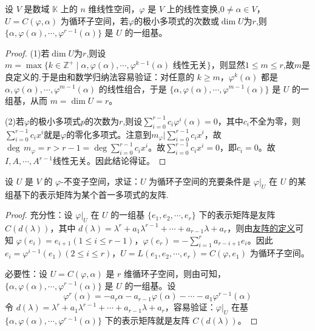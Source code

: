 \documentclass[../../main.tex]{subfiles}%
\begin{document}
\begin{theorem}\label{theorem:循环子空间的基}
设 \(V\) 是数域 \(\mathbb{K}\) 上的 \(n\) 维线性空间，\(\varphi\) 是 \(V\) 上的线性变换,\(0\neq\alpha\in V\)， \(U = C(\varphi,\alpha)\) 为循环子空间，若$\varphi$的极小多项式的次数或$\dim U$为$r$,则\(\{\alpha,\varphi(\alpha),\cdots,\varphi^{r - 1}(\alpha)\}\) 是 \(U\) 的一组基。
\end{theorem}
\begin{proof}
(1)若$\dim U$为$r$,则设 \(m = \max\{k\in\mathbb{Z}^+\mid\alpha,\varphi(\alpha),\cdots,\varphi^{k - 1}(\alpha)\text{ 线性无关}\}\)，则显然$1\leqslant  m\leqslant  r$,故$m$是良定义的.于是由和数学归纳法容易验证：对任意的 \(k\geqslant  m\)，\(\varphi^k(\alpha)\) 都是 \(\alpha,\varphi(\alpha),\cdots,\varphi^{m - 1}(\alpha)\) 的线性组合，于是 \(\{\alpha,\varphi(\alpha),\cdots,\varphi^{m - 1}(\alpha)\}\) 是 \(U\) 的一组基，从而 \(m = \dim U = r\)。 

(2)若$\varphi$的极小多项式$p$的次数为$r$,则设$\sum_{i=0}^{r-1}c_i\varphi^i(\alpha)=0$，其中$c_i$不全为零，则$\sum_{i=0}^{r-1}c_ix^i$就是$\varphi$的零化多项式。注意到$m_{\varphi}|\sum_{i=0}^{r-1}c_ix^i$，故$\deg\,m_{\varphi}=r>r-1=\deg\sum_{i=0}^{r-1}c_ix^i$。故$\sum_{i=0}^{r-1}c_ix^i=0$，即$c_i=0$。故$I,A,\cdots,A^{r-1}$线性无关。因此结论得证。
\end{proof}

\begin{theorem}\label{theorem:不变子空间是循环子空间的充要条件}
设 \(U\) 是 \(V\) 的 \(\varphi\)-不变子空间，求证：\(U\) 为循环子空间的充要条件是 \(\varphi|_U\) 在 \(U\) 的某组基下的表示矩阵为某个首一多项式的友阵.
\end{theorem}
\begin{proof}

{\heiti 充分性：}设 \(\varphi|_U\) 在 \(U\) 的一组基 \(\{e_1,e_2,\cdots,e_r\}\) 下的表示矩阵是友阵 \(C(d(\lambda))\)，其中 \(d(\lambda)=\lambda^r + a_1\lambda^{r - 1}+\cdots + a_{r - 1}\lambda + a_r\)，则由\hyperref[proposition:多项式的友矩和Frobenius块]{友阵的定义}可知 \(\varphi(e_i)=e_{i + 1}(1\leqslant  i\leqslant  r - 1)\)，\(\varphi(e_r)=-\sum_{i = 1}^{r}a_{r - i + 1}e_i\)。因此 \(e_i=\varphi^{i - 1}(e_1)(2\leqslant  i\leqslant  r)\)，\(U = L(e_1,e_2,\cdots,e_r)=C(\varphi,e_1)\) 为循环子空间。

{\heiti 必要性：}设 \(U = C(\varphi,\alpha)\) 是 \(r\) 维循环子空间，则由可知，\(\{\alpha,\varphi(\alpha),\cdots,\varphi^{r - 1}(\alpha)\}\) 是 \(U\) 的一组基。设 
\[
\varphi^r(\alpha)=-a_r\alpha - a_{r - 1}\varphi(\alpha)-\cdots - a_1\varphi^{r - 1}(\alpha)
\]
令 \(d(\lambda)=\lambda^r + a_1\lambda^{r - 1}+\cdots + a_{r - 1}\lambda + a_r\)，容易验证：\(\varphi|_U\) 在基 \(\{\alpha,\varphi(\alpha),\cdots,\varphi^{r - 1}(\alpha)\}\) 下的表示矩阵就是友阵 \(C(d(\lambda))\)。
\end{proof}
\end{document}
